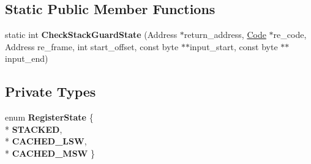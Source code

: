 \subsection*{Static Public Member Functions}
\begin{DoxyCompactItemize}
\item 
static int {\bfseries Check\+Stack\+Guard\+State} (Address $\ast$return\+\_\+address, \hyperlink{classv8_1_1internal_1_1_code}{Code} $\ast$re\+\_\+code, Address re\+\_\+frame, int start\+\_\+offset, const byte $\ast$$\ast$input\+\_\+start, const byte $\ast$$\ast$input\+\_\+end)\hypertarget{classv8_1_1internal_1_1_reg_exp_macro_assembler_a_r_m64_acb038bd373ed4b575f8addba79196d21}{}\label{classv8_1_1internal_1_1_reg_exp_macro_assembler_a_r_m64_acb038bd373ed4b575f8addba79196d21}

\end{DoxyCompactItemize}
\subsection*{Private Types}
\begin{DoxyCompactItemize}
\item 
enum {\bfseries Register\+State} \{ \\*
{\bfseries S\+T\+A\+C\+K\+ED}, 
\\*
{\bfseries C\+A\+C\+H\+E\+D\+\_\+\+L\+SW}, 
\\*
{\bfseries C\+A\+C\+H\+E\+D\+\_\+\+M\+SW}
 \}\hypertarget{classv8_1_1internal_1_1_reg_exp_macro_assembler_a_r_m64_a8eb83127b61b893f8a049b0053efa462}{}\label{classv8_1_1internal_1_1_reg_exp_macro_assembler_a_r_m64_a8eb83127b61b893f8a049b0053efa462}

\end{DoxyCompactItemize}
